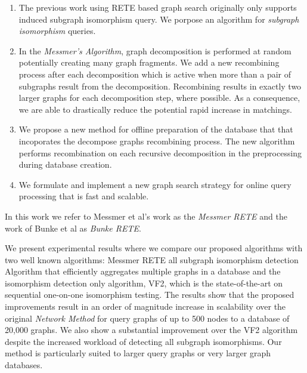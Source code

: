 \begin{enumerate}
\item The previous work using RETE based graph search originally only supports induced subgraph isomorphism query. We porpose an algorithm for \textit{subgraph isomorphism} queries.
\item  In the \textit{Messmer's Algorithm}, graph decomposition is performed at random potentially creating many graph fragments. We add a new recombining 
process after each decomposition which is active when more than a pair of  subgraphs result from the decomposition.  Recombining results in exactly two larger 
graphs for each decomposition step, where possible.  As a consequence, we are able to drastically reduce the potential rapid increase in matchings. 
\item We propose a new method for offline preparation of the database that that incoporates  the decompose graphs recombining process. The new algorithm performs recombination 
on  each recursive decomposition in the  preprocessing during database creation. 
\item We formulate and implement a new graph search strategy for online query processing that is fast and scalable.

\end{enumerate}

In this work we refer to Messmer et al's work as the \textit{Messmer RETE} and the work of Bunke et al as \textit{Bunke RETE}.


We present experimental results where we compare our proposed algorithms with two well known algorithms: Messmer RETE \cite{messmer_bunke2000} all subgraph isomorphism 
detection Algorithm that efficiently aggregates multiple graphs in a database and the isomorphism detection only algorithm, VF2\cite{cordella2001_vf2}, which is the 
state-of-the-art on sequential one-on-one isomorphism testing. The results show that the proposed improvements result in an order of magnitude increase in scalability 
over the original \textit{Network Method}  for query graphs of up to 500 nodes to a database of 20,000 graphs. We also show a substantial improvement over the VF2 
algorithm despite the increased workload of detecting all subgraph isomorphisms. Our method is particularly suited to larger query graphs or very larger graph 
databases.
